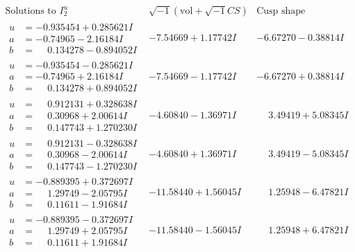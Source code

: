 \documentclass[1p]{elsarticle_modified}
\theoremstyle{definition}
\newcommand{\I}{\sqrt{-1}}
\begin{document}
$$\begin{array}{c|c|c}  
\text{Solutions to }I^u_{2}& \I (\text{vol} + \sqrt{-1}CS) & \text{Cusp shape}\\
 \hline 
\begin{aligned}
u &= -0.935454 + 0.285621 I \\
a &= -0.74965 - 2.16184 I \\
b &= \phantom{-}0.134278 - 0.894052 I\end{aligned}
 & -7.54669 + 1.17742 I & -6.67270 - 0.38814 I \\ \hline\begin{aligned}
u &= -0.935454 - 0.285621 I \\
a &= -0.74965 + 2.16184 I \\
b &= \phantom{-}0.134278 + 0.894052 I\end{aligned}
 & -7.54669 - 1.17742 I & -6.67270 + 0.38814 I \\ \hline\begin{aligned}
u &= \phantom{-}0.912131 + 0.328638 I \\
a &= \phantom{-}0.30968 + 2.00614 I \\
b &= \phantom{-}0.147743 + 1.270230 I\end{aligned}
 & -4.60840 - 1.36971 I & \phantom{-}3.49419 + 5.08345 I \\ \hline\begin{aligned}
u &= \phantom{-}0.912131 - 0.328638 I \\
a &= \phantom{-}0.30968 - 2.00614 I \\
b &= \phantom{-}0.147743 - 1.270230 I\end{aligned}
 & -4.60840 + 1.36971 I & \phantom{-}3.49419 - 5.08345 I \\ \hline\begin{aligned}
u &= -0.889395 + 0.372697 I \\
a &= \phantom{-}1.29749 - 2.05795 I \\
b &= \phantom{-}0.11611 - 1.91684 I\end{aligned}
 & -11.58440 + 1.56045 I & \phantom{-}1.25948 - 6.47821 I \\ \hline\begin{aligned}
u &= -0.889395 - 0.372697 I \\
a &= \phantom{-}1.29749 + 2.05795 I \\
b &= \phantom{-}0.11611 + 1.91684 I\end{aligned}
 & -11.58440 - 1.56045 I & \phantom{-}1.25948 + 6.47821 I \\ \hline\begin{aligned}

\end{aligned}
\end{array}$$
\end{document}
